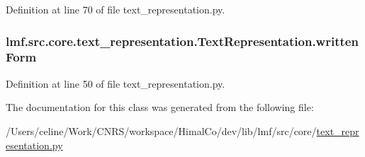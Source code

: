 Definition at line 70 of file text\+\_\+representation.\+py.

\hypertarget{classlmf_1_1src_1_1core_1_1text__representation_1_1_text_representation_a029a488706154d5fe42ecbea00974780}{
\subsubsection[{written\+Form}]{\setlength{\rightskip}{0pt plus 5cm}lmf.\+src.\+core.\+text\+\_\+representation.\+Text\+Representation.\+written\+Form}}\label{classlmf_1_1src_1_1core_1_1text__representation_1_1_text_representation_a029a488706154d5fe42ecbea00974780}


Definition at line 50 of file text\+\_\+representation.\+py.



The documentation for this class was generated from the following file\+:\begin{DoxyCompactItemize}
\item 
/\+Users/celine/\+Work/\+C\+N\+R\+S/workspace/\+Himal\+Co/dev/lib/lmf/src/core/\hyperlink{text__representation_8py}{text\+\_\+representation.\+py}\end{DoxyCompactItemize}
